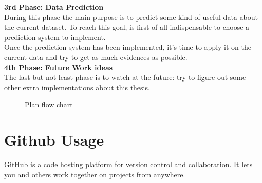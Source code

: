 \newpage

\textbf{3rd Phase: Data Prediction}\\
During this phase the main purpose is to predict some kind of useful data about the current dataset. To reach this goal, is first of all indispensable to choose a prediction system to implement. \\
Once the prediction system has been implemented, it's time to apply it on the current data and try to get as much evidences as possible. \\

\textbf{4th Phase: Future Work ideas}\\
The last but not least phase is to watch at the future: try to figure out some other extra implementations about this thesis.\\


\begin{figure}[h]

    \caption[Plan flow chart]{Plan flow chart}
    \label{fig: Development_Flow}
\end{figure}

\newpage 
\section{Github Usage}
GitHub is a code hosting platform for version control and collaboration. It lets you and others work together on projects from anywhere.

